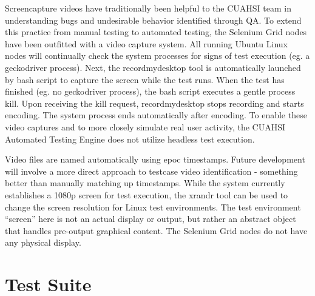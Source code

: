 \documentclass[10pt]{article}
\begin{document}
Screencapture videos have traditionally been helpful to the CUAHSI team in understanding bugs and undesirable behavior identified through QA.  To extend this practice from manual testing to automated testing, the Selenium Grid nodes have been outfitted with a video capture system.  All running Ubuntu Linux nodes will continually check the system processes for signs of test execution (eg. a geckodriver process).  Next, the recordmydesktop tool is automatically launched by bash script to capture the screen while the test runs.  When the test has finished (eg. no geckodriver process), the bash script executes a gentle process kill.  Upon receiving the kill request, recordmydesktop stops recording and starts encoding.  The system process ends automatically after encoding.  To enable these video captures and to more closely simulate real user activity, the CUAHSI Automated Testing Engine does not utilize headless test execution.

Video files are named automatically using epoc timestamps.  Future development will involve a more direct approach to testcase video identification - something better than manually matching up timestamps.  While the system currently establishes a 1080p screen for test execution, the xrandr tool can be used to change the screen resolution for Linux test environments.  The test environment ``screen'' here is not an actual display or output, but rather an abstract object that handles pre-output graphical content.  The Selenium Grid nodes do not have any physical display.

\section{Test Suite}
\end{document}
